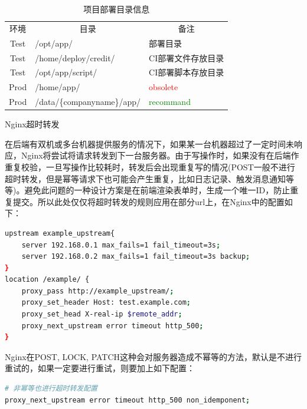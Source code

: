 \documentclass[8pt]{book}
\makeatletter
\numberwithin{dummy}{section}
\theoremstyle{ocrenumbox}
\theoremstyle{blacknumex}
\theoremstyle{blacknumbox}
\theoremstyle{ocrenum}
\renewcommand{\subsection}{\@startsection {subsection}{2}{\z@}
	{-3ex \@plus -0.1ex \@minus -.4ex}
	{0.5ex \@plus.2ex }
	{\normalfont\sffamily\bfseries}}
\makeatother
\begin{document}
\begin{table}[htbp]
	\caption{项目部署目录信息}
	\label{table:projectdirectionayinfo}
	\begin{center}
		\begin{tabular}{|c|p{4cm}|p{4cm}|}
			\hline
			\multirow{1}{*}{环境}
			& \multicolumn{1}{c|}{目录}
			& \multicolumn{1}{c|}{备注}\\			
			\cline{1-3}
			Test  & /opt/app/ & 部署目录 \\
			\hline
			Test  & /home/deploy/credit/ & CI部署文件存放目录 \\
			\hline
			Test  & /opt/app/script/ & CI部署脚本存放目录 \\
			\hline
			Prod  & /home/app/ & \textcolor{red}{obsolete} \\
			\hline
			Prod  & /data/\{companyname\}/app/ & \textcolor{green}{recommand} \\
			\hline							
		\end{tabular}	
	\end{center}
\end{table}

\subsection{Nginx超时转发}

在后端有双机或多台机器提供服务的情况下，如果某一台机器超过了一定时间未响应，Nginx将尝试将请求转发到下一台服务器。由于写操作时，如果没有在后端作重复校验，一旦写操作比较耗时，转发后会出现重复写的情况(POST一般不进行超时转发，但是幂等请求下也可能会产生重复，比如日志记录、触发消息通知等等)。避免此问题的一种设计方案是在前端渲染表单时，生成一个唯一ID，防止重复提交。所以此处仅仅将超时转发的规则应用在部分url上，在Nginx中的配置如下：

\begin{lstlisting}[language=Bash]
upstream example_upstream{
	server 192.168.0.1 max_fails=1 fail_timeout=3s;
	server 192.168.0.2 max_fails=1 fail_timeout=3s backup;
}
location /example/ {
	proxy_pass http://example_upstream/;
	proxy_set_header Host: test.example.com;
	proxy_set_head X-real-ip $remote_addr;
	proxy_next_upstream error timeout http_500;
}
\end{lstlisting}

Nginx在POST, LOCK, PATCH这种会对服务器造成不幂等的方法，默认是不进行重试的，如果一定要进行重试，则要加上如下配置：

\begin{lstlisting}[language=Bash]
# 非幂等也进行超时转发配置
proxy_next_upstream error timeout http_500 non_idemponent;
\end{lstlisting}
\end{document}

